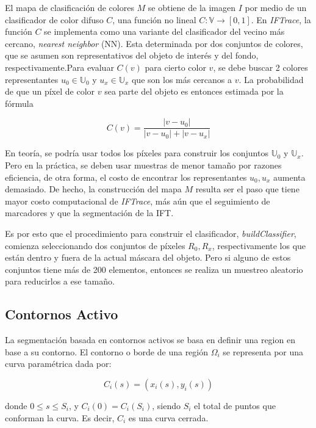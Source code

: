 \documentclass[a4paper,10pt]{article}
\begin{document}
El mapa de clasificación de colores $M$ se obtiene de la imagen $I$ por medio de un
clasificador de color difuso $C$, una función no lineal $C : \mathbb{V} \to [0,1]$.
En \textit{IFTrace}, la función $C$ se implementa como una variante del clasificador
del vecino más cercano, \textit{nearest neighbor} (NN). Esta determinada por dos conjuntos de
colores, que se asumen son representativos del objeto de interés y del fondo, respectivamente.Para evaluar $C(v)$ para
cierto color $v$, se debe buscar 2 colores representantes $u_{0} \in \mathbb{U}_{0}$
y $u_{x} \in \mathbb{U}_{x}$ que son los más cercanos a $v$.
La probabilidad de que un píxel de color $v$ sea parte del objeto es entonces estimada
por la fórmula

\begin{equation}
   \label{eq:IFTrace-color-classifier}
   C(v) = \frac{|v - u_{0}|}{|v - u_{0}| + |v - u_{x}|}
\end{equation}

En teoría, se podría usar todos los píxeles para construir los conjuntos
$\mathbb{U}_{0}$ y $\mathbb{U}_{x}$. Pero en la práctica, se deben usar muestras
de menor tamaño por razones eficiencia, de otra forma, el costo de encontrar los
representantes $u_{0},u_{x}$ aumenta demasiado. De hecho, la construcción del mapa
$M$ resulta ser el paso que tiene mayor costo computacional de \textit{IFTrace}, más
aún que el seguimiento de marcadores y que la segmentación de la IFT.

Es por esto que el procedimiento para construir el clasificador,
\textit{buildClassifier}, comienza seleccionando dos conjuntos de píxeles
$R_{0},R_{x}$, respectivamente los que están dentro y fuera de la actual máscara
del objeto. Pero si alguno de estos conjuntos tiene más de 200 elementos,
entonces se realiza un muestreo aleatorio para reducirlos a ese tamaño.

\subsection{Contornos Activo}

La segmentación basada en contornos activos se basa en definir una region en base a su contorno.
El contorno o borde de una región $\Omega_i$ se representa por una curva paramétrica dada por:

\begin{equation}
    C_i(s) = (x_i(s), y_i(s))
\end{equation}

donde $0 \leq s \leq S_i$, y $C_i(0) = C_i(S_i)$, siendo $S_i$ el total de puntos que conforman la curva.
Es decir, $C_i$ es una curva cerrada. 
\end{document}
